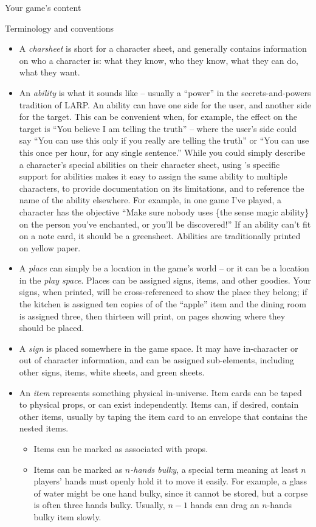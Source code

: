 \documentclass{article}
\begin{document}
\begin{section}{Your game's content}
\begin{subsection}{Terminology and conventions}
\begin{itemize}
    \item A \textit{charsheet} is short for a character sheet, and generally contains information on who a character is: what they know, who they know, what they can do, what they want.
    \item An \textit{ability} is what it sounds like – usually a ``power'' in the secrets-and-powers tradition of LARP.  An ability can have one side for the user, and another side for the target.  This can be convenient when, for example, the effect on the target is ``You believe I am telling the truth'' -- where the user's side could say ``You can use this only if you really are telling the truth'' or ``You can use this once per hour, for any single sentence.'' While you could simply describe a character's special abilities on their character sheet, using \gametex{}'s specific support for abilities makes it easy to assign the same ability to multiple characters, to provide documentation on its limitations, and to reference the name of the ability elsewhere.  For example, in one game I've played, a character has the objective ``Make sure nobody uses \{the sense magic ability\} on the person you've enchanted, or you'll be discovered!''  If an ability can't fit on a note card, it should be a greensheet.  Abilities are traditionally printed on yellow paper.
    \item A \textit{place} can simply be a location in the game's world -- or it can be a location in the \textit{play space}.  Places can be assigned signs, items, and other goodies.  Your signs, when printed, will be cross-referenced to show the place they belong; if the kitchen is assigned ten copies of of the ``apple'' item and the dining room is assigned three, then thirteen will print, on pages showing where they should be placed.
   \item A \textit{sign} is placed somewhere in the game space.  It may have in-character or out of character information, and can be assigned sub-elements, including other signs, items, white sheets, and green sheets.
  \item An \textit{item} represents something physical in-universe.  Item cards can be taped to physical props, or can exist independently.  Items can, if desired, contain other items, usually by taping the item card to an envelope that contains the nested items.
\begin{itemize}
\item  Items can be marked as associated with props.
\item   Items can be marked as \textit{$n$-hands bulky}, a special term meaning at least $n$ players' hands must openly hold it to move it easily.  For example, a glass of water might be one hand bulky, since it cannot be stored, but a corpse is often three hands bulky.  Usually, $n-1$ hands can drag an $n$-hands bulky item slowly.

\end{itemize}
\end{itemize}
\end{subsection}
\end{section}
\end{document}
